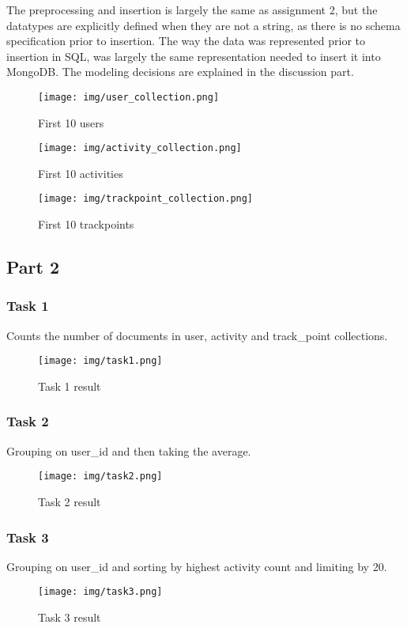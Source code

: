 \documentclass[12pt, titlepage]{report}
\begin{document}
The preprocessing and insertion is largely the same as assignment 2, but the datatypes are explicitly defined when they are not a string, as there is no schema specification prior to insertion. The way the data was represented prior to insertion in SQL, was largely the same representation needed to insert it into MongoDB. The modeling decisions are explained in the discussion part.
\begin{figure}[H]
    \centering
    \texttt{[image: img/user\_collection.png]}
    \caption{First 10 users}
    \label{fig:my_label}
\end{figure}
\begin{figure}[H]
    \centering
    \texttt{[image: img/activity\_collection.png]}
    \caption{First 10 activities}
    \label{fig:my_label}
\end{figure}
\begin{figure}[H]
    \centering
    \texttt{[image: img/trackpoint\_collection.png]}
    \caption{First 10 trackpoints}
    \label{fig:my_label}
\end{figure}
\subsection*{Part 2}
\subsubsection*{Task 1}
Counts the number of documents in user, activity and track\_point collections.
\begin{figure}[H]
    \centering
    \texttt{[image: img/task1.png]}
    \caption{Task 1 result}
    \label{fig:my_label}
\end{figure}
\subsubsection*{Task 2}
Grouping on user\_id and then taking the average.
\begin{figure}[H]
    \centering
    \texttt{[image: img/task2.png]}
    \caption{Task 2 result}
    \label{fig:my_label}
\end{figure}
\subsubsection*{Task 3}
Grouping on user\_id and sorting by highest activity count and limiting by 20.
\begin{figure}[H]
    \centering
    \texttt{[image: img/task3.png]}
    \caption{Task 3 result}
    \label{fig:my_label}
\end{figure}
\end{document}

